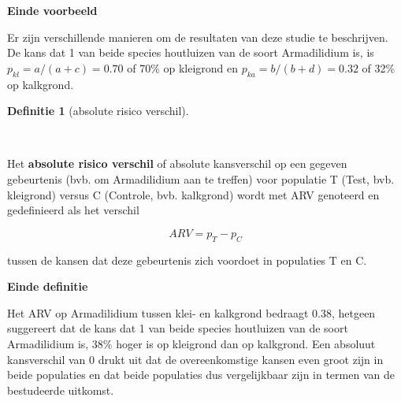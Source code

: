 \documentclass[
  dutch,
  letterpaper,
  12pt]{book}
\theoremstyle{definition}
\theoremstyle{definition}
\newtheorem{definition}{Definitie}[chapter]
\theoremstyle{definition}
\theoremstyle{remark}
\begin{document}
\begin{table}

\caption{\label{tbl-cox}}


\end{table}%

\textbf{Einde voorbeeld}

Er zijn verschillende manieren om de resultaten van deze studie te
beschrijven. De kans dat 1 van beide species houtluizen van de soort
Armadilidium is, is \(p_{kl}=a/(a+c)=0.70\) of 70\% op kleigrond en
\(p_{ka}=b/(b+d)=0.32\) of 32\% op kalkgrond.

\begin{definition}[absolute risico
verschil]\protect\hypertarget{def-absolute-risico-verschil}{}\label{def-absolute-risico-verschil}

~

\end{definition}

Het \textbf{absolute risico verschil} of absolute kansverschil op een
gegeven gebeurtenis (bvb. om Armadilidium aan te treffen) voor populatie
T (Test, bvb. kleigrond) versus C (Controle, bvb. kalkgrond) wordt met
ARV genoteerd en gedefinieerd als het verschil

\begin{equation*}
ARV=p_T-p_C
\end{equation*}

tussen de kansen dat deze gebeurtenis zich voordoet in populaties T en
C.

\textbf{Einde definitie}

Het ARV op Armadilidium tussen klei- en kalkgrond bedraagt 0.38, hetgeen
suggereert dat de kans dat 1 van beide species houtluizen van de soort
Armadilidium is, 38\% hoger is op kleigrond dan op kalkgrond. Een
absoluut kansverschil van 0 drukt uit dat de overeenkomstige kansen even
groot zijn in beide populaties en dat beide populaties dus vergelijkbaar
zijn in termen van de bestudeerde uitkomst.
\end{document}
